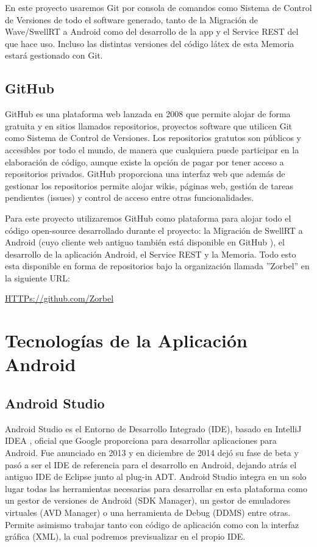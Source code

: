 	En este proyecto usaremos Git por consola de comandos como Sistema de Control de Versiones de todo el software generado, tanto de la Migración de Wave/SwellRT a Android como del desarrollo de la app y el Service REST del que hace uso. Incluso las distintas versiones del código látex de esta Memoria estará gestionado con Git.
     
    \subsection{GitHub}\label{ssec:github}
    
    GitHub \cite{ref:github} es una plataforma web lanzada en 2008 que permite alojar de forma gratuita y en sitios llamados repositorios, proyectos software que utilicen Git como Sistema de Control de Versiones. Los repositorios gratutos son públicos y accesibles por todo el mundo, de manera que cualquiera puede participar en la elaboración de código, aunque existe la opción de pagar por tener acceso a repositorios privados. GitHub proporciona una interfaz web que además de gestionar los repositorios permite alojar wikis, páginas web, gestión de tareas pendientes (issues) y control de acceso entre otras funcionalidades.
    
    Para este proyecto utilizaremos GitHub como plataforma para alojar todo el código open-source desarrollado durante el proyecto: la Migración de SwellRT a Android (cuyo cliente web antiguo también está disponible en GitHub \cite{ref:swellRT_github}), el desarrollo de la aplicación Android, el Service REST y la Memoria. Todo esto esta disponible en forma de repositorios bajo la organización llamada ''Zorbel'' en la siguiente URL:
    
    \url{HTTPs://github.com/Zorbel}    

\section{Tecnologías de la Aplicación Android}
    
    \subsection{Android Studio}\label{ssec:androidStudio}
    
	Android Studio \cite{ref:android_studio} es el Entorno de Desarrollo Integrado (IDE), basado en IntelliJ IDEA \cite{ref:intelliJ_Idea}, oficial que Google proporciona para desarrollar aplicaciones para Android. Fue anunciado en 2013 y en diciembre de 2014 dejó su fase de beta y pasó a ser el IDE de referencia para el desarrollo en Android, dejando atrás el antiguo IDE de Eclipse junto al plug-in ADT. Android Studio integra en un solo lugar todas las herramientas necesarias para desarrollar en esta plataforma como un gestor de versiones de Android (SDK Manager), un gestor de emuladores virtuales (AVD Manager) o una herramienta de Debug (DDMS) entre otras. Permite asimismo trabajar tanto con código de aplicación como con la interfaz gráfica (XML), la cual podremos previsualizar en el propio IDE.
	
